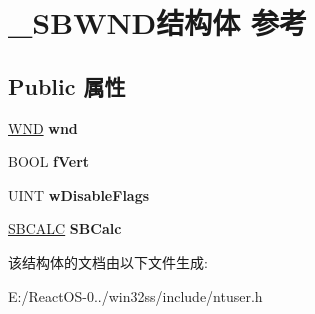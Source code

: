 \hypertarget{struct___s_b_w_n_d}{}\section{\+\_\+\+S\+B\+W\+N\+D结构体 参考}
\label{struct___s_b_w_n_d}
\subsection*{Public 属性}
\begin{DoxyCompactItemize}
\item 
\mbox{\label{struct___s_b_w_n_d_a55f1850322c17b524fb902747caf503c}} 
\hyperlink{struct___w_n_d}{W\+ND} {\bfseries wnd}
\item 
\mbox{\label{struct___s_b_w_n_d_a7f468d00723de0203fa110fd3acc4e32}} 
B\+O\+OL {\bfseries f\+Vert}
\item 
\mbox{\label{struct___s_b_w_n_d_add5d3c4a6d997d50f38e12d522f81172}} 
U\+I\+NT {\bfseries w\+Disable\+Flags}
\item 
\mbox{\label{struct___s_b_w_n_d_a2a888699b9b56df486a050032dcb1caa}} 
\hyperlink{structtag_s_b_c_a_l_c}{S\+B\+C\+A\+LC} {\bfseries S\+B\+Calc}
\end{DoxyCompactItemize}


该结构体的文档由以下文件生成\+:\begin{DoxyCompactItemize}
\item 
E\+:/\+React\+O\+S-\/0../win32ss/include/ntuser.\+h\end{DoxyCompactItemize}
